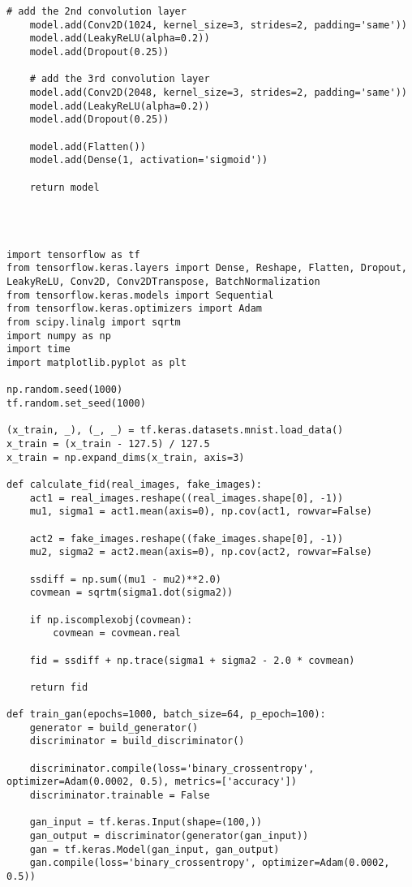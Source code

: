 \begin{lstlisting}[style=mypython, caption= {Explore GAN with 6 Convolutional Layers in Generator \\ and 6 Convolutional Layers in Discriminator}]
    # add the 2nd convolution layer
    model.add(Conv2D(1024, kernel_size=3, strides=2, padding='same'))
    model.add(LeakyReLU(alpha=0.2))
    model.add(Dropout(0.25))

    # add the 3rd convolution layer
    model.add(Conv2D(2048, kernel_size=3, strides=2, padding='same'))
    model.add(LeakyReLU(alpha=0.2))
    model.add(Dropout(0.25))

    model.add(Flatten())
    model.add(Dense(1, activation='sigmoid'))

    return model




import tensorflow as tf
from tensorflow.keras.layers import Dense, Reshape, Flatten, Dropout, LeakyReLU, Conv2D, Conv2DTranspose, BatchNormalization
from tensorflow.keras.models import Sequential
from tensorflow.keras.optimizers import Adam
from scipy.linalg import sqrtm
import numpy as np
import time
import matplotlib.pyplot as plt

np.random.seed(1000)
tf.random.set_seed(1000)

(x_train, _), (_, _) = tf.keras.datasets.mnist.load_data()
x_train = (x_train - 127.5) / 127.5
x_train = np.expand_dims(x_train, axis=3)

def calculate_fid(real_images, fake_images):
    act1 = real_images.reshape((real_images.shape[0], -1))
    mu1, sigma1 = act1.mean(axis=0), np.cov(act1, rowvar=False)
    
    act2 = fake_images.reshape((fake_images.shape[0], -1))
    mu2, sigma2 = act2.mean(axis=0), np.cov(act2, rowvar=False)
    
    ssdiff = np.sum((mu1 - mu2)**2.0)
    covmean = sqrtm(sigma1.dot(sigma2))
    
    if np.iscomplexobj(covmean):
        covmean = covmean.real
    
    fid = ssdiff + np.trace(sigma1 + sigma2 - 2.0 * covmean)
    
    return fid

def train_gan(epochs=1000, batch_size=64, p_epoch=100):
    generator = build_generator()
    discriminator = build_discriminator()

    discriminator.compile(loss='binary_crossentropy', optimizer=Adam(0.0002, 0.5), metrics=['accuracy'])
    discriminator.trainable = False

    gan_input = tf.keras.Input(shape=(100,))
    gan_output = discriminator(generator(gan_input))
    gan = tf.keras.Model(gan_input, gan_output)
    gan.compile(loss='binary_crossentropy', optimizer=Adam(0.0002, 0.5))


\end{lstlisting}
